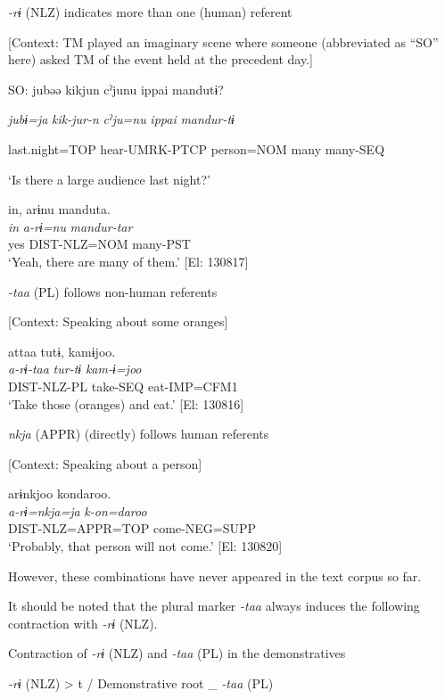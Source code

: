 \ea \label{ex:5:17}  \ea \label{ex:5:17a} \textit{{}-rɨ} (NLZ) indicates more than one (human) referent

    [Context: TM played an imaginary scene where someone (abbreviated as “SO” here) asked TM of the event held at the precedent day.]

    SO:  jubəə  kikjun  cˀjunu  ippai  mandutɨ?

      \textit{jubɨ=ja}  \textit{kik-jur-n}  \textit{cˀju=nu}  \textit{ippai}  \textit{mandur-tɨ}

      last.night=TOP  hear-UMRK-PTCP  person=NOM  many  many-SEQ

      ‘Is there a large audience last night?’

\glll  in,  arɨnu  manduta.\\
\textit{in}  \textit{a-rɨ=nu}  \textit{mandur-tar}\\
yes  DIST-NLZ=NOM  many-PST\\
\glt ‘Yeah, there are many of them.’ [El: 130817]

 \ex \label{ex:5:b} \textit{{}-taa} (PL) follows non-human referents

    [Context: Speaking about some oranges]

\glll  attaa  tutɨ,  kamɨjoo.\\
\textit{a-rɨ-taa}  \textit{tur-tɨ}  \textit{kam-ɨ=joo}\\
DIST-NLZ-PL  take-SEQ  eat-IMP=CFM1\\
\glt ‘Take those (oranges) and eat.’ [El: 130816]

 \ex \label{ex:5:c} \textit{nkja} (APPR) (directly) follows human referents

    [Context: Speaking about a person]

\glll  arɨnkjoo  kondaroo.\\
\textit{a-rɨ=nkja=ja}  \textit{k-on=daroo}\\
DIST-NLZ=APPR=TOP  come-NEG=SUPP\\
\glt ‘Probably, that person will not come.’ [El: 130820]
\z
\z

However, these combinations have never appeared in the text corpus so far.

It should be noted that the plural marker \textit{{}-taa} always induces the following contraction with \textit{{}-rɨ} (NLZ).

\ea \label{ex:5:18}   Contraction of \textit{{}-rɨ} (NLZ) and \textit{{}-taa} (PL) in the demonstratives

  \textit{{}-rɨ} (NLZ)  >  t  /  Demonstrative root  \_  \textit{{}-taa} (PL)
\z


